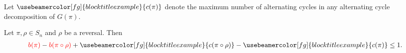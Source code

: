 \documentclass[handout]{beamer}
\theoremstyle{definition}
\def\padding{\vspace{0.5cm}}
\def\r{\textcolor{red}}
\def\g#1{{\usebeamercolor[fg]{block title example}{#1}}}
\begin{document}



\begin{frame}

Let $\g{c(\pi)}$ denote the maximum number of alternating cycles in any alternating cycle decomposition of $G(\pi)$. \pause\padding

\begin{theorem}
\label{thm:1}
Let $\pi, \rho \in S_n$ and $\rho$ be a reversal. \pause Then
\begin{align*}
    \r{b(\pi)} - \r{b(\pi \circ \rho)} + \g{c(\pi \circ \rho)} - \g{c(\pi)} \leq 1.
\end{align*}
\end{theorem}

\end{frame}
\end{document}
